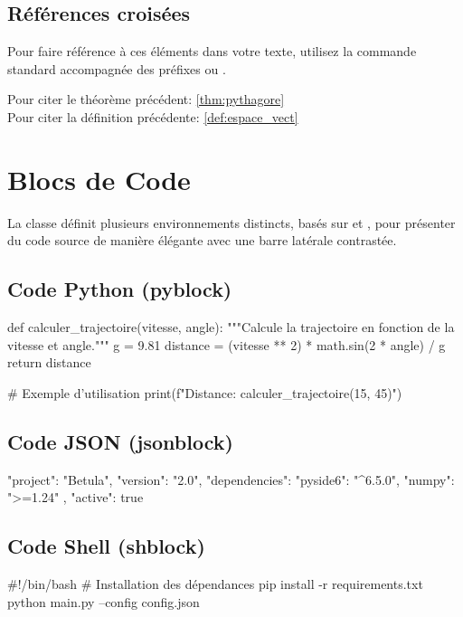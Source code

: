 \documentclass[theme=betula]{myrtille}
\begin{document}
\subsection{Références croisées}
Pour faire référence à ces éléments dans votre texte, utilisez la commande standard  accompagnée des préfixes  ou .

Pour citer le théorème précédent: \ref{thm:pythagore}\\
Pour citer la définition précédente: \ref{def:espace_vect}

\section{Blocs de Code}
La classe définit plusieurs environnements distincts, basés sur  et , pour présenter du code source de manière élégante avec une barre latérale contrastée.

\subsection{Code Python (pyblock)}
\begin{pyblock}
def calculer_trajectoire(vitesse, angle):
    """Calcule la trajectoire en fonction de la vitesse et angle."""
    g = 9.81
    distance = (vitesse ** 2) * math.sin(2 * angle) / g
    return distance

# Exemple d'utilisation
print(f"Distance: {calculer_trajectoire(15, 45)}")
\end{pyblock}

\subsection{Code JSON (jsonblock)}
\begin{jsonblock}
{
  "project": "Betula",
  "version": "2.0",
  "dependencies": {
    "pyside6": "^6.5.0",
    "numpy": ">=1.24"
  },
  "active": true
}
\end{jsonblock}

\subsection{Code Shell (shblock)}
\begin{shblock}
#!/bin/bash
# Installation des dépendances
pip install -r requirements.txt
python main.py --config config.json
\end{shblock}
\end{document}

